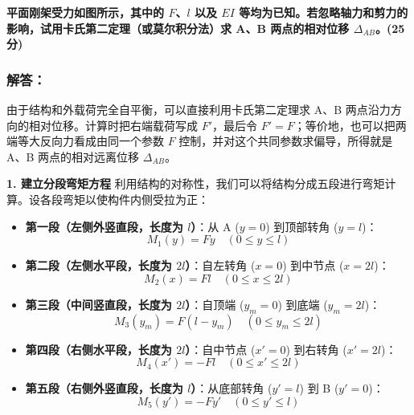 \documentclass[11pt,a4paper]{ctexrep}
\begin{document}
{\textbf{平面刚架受力如图所示，其中的 $F$、$l$ 以及 $EI$ 等均为已知。若忽略轴力和剪力的影响，试用卡氏第二定理（或莫尔积分法）求 A、B 两点的相对位移 $\Delta_{AB}$。(25 分)}

\begin{center}
\end{center}

\subsubsection*{解答：}

由于结构和外载荷完全自平衡，可以直接利用卡氏第二定理求 A、B 两点沿力方向的相对位移。计算时把右端载荷写成 $F'$，最后令 $F'=F$；等价地，也可以把两端等大反向力看成由同一个参数 $F$ 控制，并对这个共同参数求偏导，所得就是 A、B 两点的相对远离位移 $\Delta_{AB}$。

\textbf{1. 建立分段弯矩方程}
利用结构的对称性，我们可以将结构分成五段进行弯矩计算。设各段弯矩以使构件内侧受拉为正：
\begin{itemize}
    \item \textbf{第一段（左侧外竖直段，长度为 $l$）}：从 A ($y=0$) 到顶部转角 ($y=l$)：
    \[
    M_1(y) = F y \quad (0 \le y \le l)
    \]
    \item \textbf{第二段（左侧水平段，长度为 $2l$）}：自左转角 ($x=0$) 到中节点 ($x=2l$)：
    \[
    M_2(x) = F l \quad (0 \le x \le 2l)
    \]
    \item \textbf{第三段（中间竖直段，长度为 $2l$）}：自顶端 ($y_m=0$) 到底端 ($y_m=2l$)：
    \[
    M_3(y_m) = F(l - y_m) \quad (0 \le y_m \le 2l)
    \]
    \item \textbf{第四段（右侧水平段，长度为 $2l$）}：自中节点 ($x'=0$) 到右转角 ($x'=2l$)：
    \[
    M_4(x') = -F l \quad (0 \le x' \le 2l)
    \]
    \item \textbf{第五段（右侧外竖直段，长度为 $l$）}：从底部转角 ($y'=l$) 到 B ($y'=0$)：
    \[
    M_5(y') = -F y' \quad (0 \le y' \le l)
    \]
\end{itemize}

}
\end{document}
